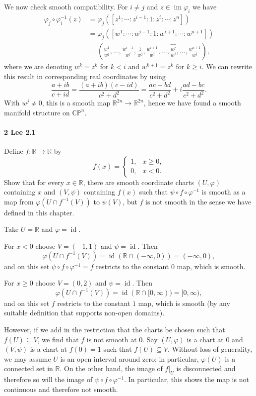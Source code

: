 \documentclass[12pt]{article}
\newlength{\myparskip}
\newenvironment{fullbox}{\begin{lrbox}{\savefullbox}\begin{minipage}{\dimexpr\textwidth-2\fboxsep\relax}\setlength{\parskip}{\myparskip}}{\end{minipage}\end{lrbox}\framebox[\textwidth]{\usebox{\savefullbox}}}
\newenvironment{pbox}[1][]{\begin{fullbox}\def\temp{#1}\ifx\temp\empty\else\paragraph{#1}\phantom{}\fi}{\end{fullbox}}
\theoremstyle{definition}
\newcommand{\R}{\mathbb{R}}
\newcommand{\C}{\mathbb{C}}
\renewcommand{\P}{\mathbb{P}}
\renewcommand{\phi}{\varphi}
\newcommand{\<}{\langle}
\renewcommand{\>}{\rangle}
\newcommand{\seq}{\subseteq}
\DeclareMathOperator{\id}{id}
\DeclareMathOperator{\im}{im}
\renewcommand{\hat}{\widehat}
\begin{document}
We now check smooth compatibility.
For $i \ne j$ and $z \in \im \phi_i$ we have
\begin{align*}
    \phi_j \circ \phi_i^{-1}(z)
        &= \phi_j([z^1 : \cdots : z^{i-1} : 1 : z^i : \cdots : z^n]) \\
        &= \phi_j([w^1 : \cdots : w^{i-1} : 1 : w^{i+1} : \cdots : w^{n+1}]) \\
        &= \textstyle\left(\frac{w^1}{w^j}, \dots, \frac{w^{i-1}}{w^j}, \frac{1}{w^j}, \frac{w^{i+1}}{w^j}, \dots, \hat{\frac{w^j}{w^j}}, \dots, \frac{w^{n+1}}{w^j}\right),
\end{align*}
where we are denoting $w^k = z^k$ for $k < i$ and $w^{k+1} = z^k$ for $k \geq i$.
We can rewrite this result in corresponding real coordinates by using
\[
    \frac{a + ib}{c + id}
        = \frac{(a + ib)(c - id)}{c^2 + d^2}
        = \frac{ac + bd}{c^2 + d^2} + i\frac{ad - bc}{c^2 + d^2}.
\]
With $w^j \ne 0$, this is a smooth map $\R^{2n} \to \R^{2n}$, hence we have found a smooth manifold structure on $\C\P^n$.




\newpage
\begin{pbox}[2 Lee 2.1]
    Define $f:\R\to \R$ by
    \[
        f(x) = \begin{cases}
            1, & x \geq 0,\\
            0, & x < 0.
        \end{cases}
    \]
    Show that for every $x\in \R$, there are smooth coordinate charts $(U,\phi)$ containing $x$ and $(V,\psi)$ containing $f(x)$ such that $\psi \circ f \circ \phi^{-1}$ is smooth as a map from $\phi(U \cap f^{-1}(V))$ to $\psi(V)$, but $f$ is not smooth in the sense we have defined in this chapter.
\end{pbox}

Take $U = \R$ and $\phi = \id$.

For $x < 0$ choose $V = (-1, 1)$ and $\psi = \id$.
Then
\[
    \phi(U \cap f^{-1}(V))
        = \id(\R \cap (-\infty, 0))
        = (-\infty, 0),
\]
and on this set $\psi \circ f \circ \phi^{-1} = f$ restricts to the constant 0 map, which is smooth.

For $x \geq 0$ choose $V = (0, 2)$ and $\psi = \id$.
Then 
\[
    \phi(U \cap f^{-1}(V))
        = \id(\R \cap [0, \infty))
        = [0, \infty),
\]
and on this set $f$ restricts to the constant $1$ map, which is smooth (by any suitable definition that supports non-open domains).

However, if we add in the restriction that the charts be chosen such that $f(U) \seq V$, we find that $f$ is not smooth at 0.
Say $(U, \phi)$ is a chart at 0 and $(V, \psi)$ is a chart at $f(0) = 1$ such that $f(U) \seq V$.
Without loss of generality, we may assume $U$ is an open interval around zero; in particular, $\phi(U)$ is a connected set in $\R$.
On the other hand, the image of $f|_U$ is disconnected and therefore so will the image of $\psi \circ f \circ \phi^{-1}$.
In particular, this shows the map is not continuous and therefore not smooth.
\end{document}
